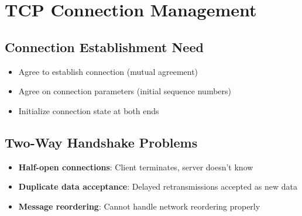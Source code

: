 \documentclass[12pt]{article}
\begin{document}
\section{TCP Connection Management}

\subsection{Connection Establishment Need}
\begin{itemize}
    \item Agree to establish connection (mutual agreement)
    \item Agree on connection parameters (initial sequence numbers)
    \item Initialize connection state at both ends
\end{itemize}

\subsection{Two-Way Handshake Problems}
\begin{itemize}
    \item \textbf{Half-open connections}: Client terminates, server doesn't know
    \item \textbf{Duplicate data acceptance}: Delayed retransmissions accepted as new data
    \item \textbf{Message reordering}: Cannot handle network reordering properly
\end{itemize}
\end{document}
